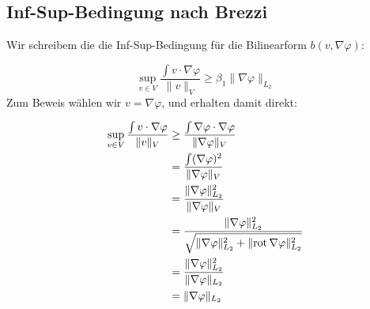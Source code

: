 \subsection{Inf-Sup-Bedingung nach Brezzi}
Wir schreibem die die Inf-Sup-Bedingung f\"ur die Bilinearform $b(v,\nabla\varphi)$:
\par
\begin{equation}
	\sup_{v\in V} \frac{\int v\cdot\nabla\varphi}{\|v\|_{V}} \geq \beta_1\|\nabla\varphi\|_{L_2}
\end{equation}
Zum Beweis w\"ahlen wir $v=\nabla\varphi$, und erhalten damit direkt:
\par
\begin{align}
	\sup_{v\in V} \frac{\int v\cdot\nabla\varphi}{\|v\|_V}
	&\geq \frac{\int \nabla\varphi\cdot\nabla\varphi}{\|\nabla\varphi\|_V} \\
	&= \frac{\int (\nabla\varphi)^2}{\|\nabla\varphi\|_{V}}\\
	&= \frac{\|\nabla\varphi\|^2_{L_2}}{\|\nabla\varphi\|_{V}} \\
	&= \frac{\|\nabla\varphi\|^2_{L_2}}{\sqrt{\|\nabla\varphi\|^2_{L_2} + \|\mathrm{rot}\,{\nabla\varphi}\|^2_{L_2}}} \\
	&= \frac{\|\nabla\varphi\|^2_{L_2}}{\|\nabla\varphi\|_{L_2}} \\
	&= \|\nabla\varphi\|_{L_2}
\end{align}
